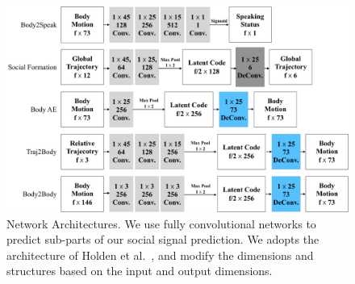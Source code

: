 \begin{figure}[t]	
	\includegraphics[width=\textwidth]{ssp_fig/networks}
	\caption{Network Architectures. We use fully convolutional networks to predict sub-parts of our social signal prediction. We adopts the architecture of Holden et al.~\cite{holden2016deep}, and modify the dimensions and structures based on the input and output dimensions. }
	\label{fig:architectures}
\end{figure}






